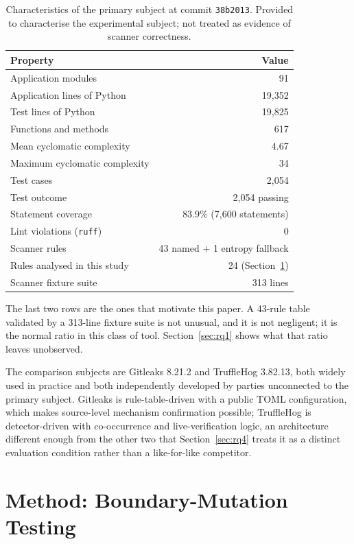 \documentclass[journal]{IEEEtran}
\begin{document}
\begin{table}[t]
\centering
\caption{Characteristics of the primary subject at commit \texttt{38b2013}. Provided to characterise the experimental subject; not treated as evidence of scanner correctness.}
\label{tab:subject}
\small
\begin{tabular}{@{}lr@{}}
\toprule
Property & Value \\
\midrule
Application modules & 91 \\
Application lines of Python & 19{,}352 \\
Test lines of Python & 19{,}825 \\
Functions and methods & 617 \\
Mean cyclomatic complexity & 4.67 \\
Maximum cyclomatic complexity & 34 \\
\midrule
Test cases & 2{,}054 \\
Test outcome & 2{,}054 passing \\
Statement coverage & 83.9\% (7{,}600 statements) \\
Lint violations (\texttt{ruff}) & 0 \\
\midrule
Scanner rules & 43 named $+$ 1 entropy fallback \\
Rules analysed in this study & 24 (Section~\ref{sec:method}) \\
Scanner fixture suite & 313 lines \\
\bottomrule
\end{tabular}
\end{table}

The last two rows are the ones that motivate this paper. A 43-rule table validated by a 313-line fixture suite is not unusual, and it is not negligent; it is the normal ratio in this class of tool. Section~\ref{sec:rq1} shows what that ratio leaves unobserved.

The comparison subjects are Gitleaks 8.21.2 and TruffleHog 3.82.13, both widely used in practice and both independently developed by parties unconnected to the primary subject. Gitleaks is rule-table-driven with a public TOML configuration, which makes source-level mechanism confirmation possible; TruffleHog is detector-driven with co-occurrence and live-verification logic, an architecture different enough from the other two that Section~\ref{sec:rq4} treats it as a distinct evaluation condition rather than a like-for-like competitor.

\section{Method: Boundary-Mutation Testing}
\label{sec:method}
\end{document}
